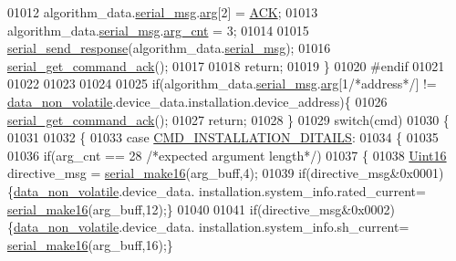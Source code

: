 \begin{DoxyCode}
{{{{{01012            algorithm\_data.\hyperlink{a00016_afcf5f557aea688aad985eec15269c1da}{serial\_msg}.\hyperlink{a00031_af7d6f762438c80072bd9dc0e4dd4ae1e}{arg}[2] = \hyperlink{a00021_a6f6489887e08bff4887d0bc5dcf214d8}{ACK};
01013            algorithm\_data.\hyperlink{a00016_afcf5f557aea688aad985eec15269c1da}{serial\_msg}.\hyperlink{a00031_a7b79f40e2eeec288091afd340bf8f591}{arg\_cnt} = 3;
01014            
01015            \hyperlink{a00031_a96a3f016ca5b0736424c2695fe9fbdf8}{serial\_send\_response}(algorithm\_data.\hyperlink{a00016_afcf5f557aea688aad985eec15269c1da}{serial\_msg});
01016            \hyperlink{a00031_a7fc7421ed15d6e4516e9878e7455d715}{serial\_get\_command\_ack}();
01017            
01018            \textcolor{keywordflow}{return};
01019         \}
01020 \textcolor{preprocessor}{#endif}
01021 
01022 
01023 
01024 
01025         \textcolor{keywordflow}{if}(algorithm\_data.\hyperlink{a00016_afcf5f557aea688aad985eec15269c1da}{serial\_msg}.\hyperlink{a00031_af7d6f762438c80072bd9dc0e4dd4ae1e}{arg}[1\textcolor{comment}{/*address*/}] != 
      \hyperlink{a00060_a76ac5f917f5308dcd83de0d7c94559fb}{data\_non\_volatile}.device\_data.installation.device\_address)\{
01026             \hyperlink{a00031_a7fc7421ed15d6e4516e9878e7455d715}{serial\_get\_command\_ack}();
01027            \textcolor{keywordflow}{return};
01028         \}
01029         \textcolor{keywordflow}{switch}(cmd)
01030         \{
01031 
01032           \{    
01033                  \textcolor{keywordflow}{case}  \hyperlink{a00021_af91ff280feea1f52e3bdd7f0f556d153}{CMD\_INSTALLATION\_DITAILS}:
01034                 \{
01035 
01036                          \textcolor{keywordflow}{if}(arg\_cnt == 28 \textcolor{comment}{/*expected argument length*/})
01037                          \{
01038                             \hyperlink{a00072_a59a9f6be4562c327cbfb4f7e8e18f08b}{Uint16} directive\_msg =  \hyperlink{a00031_abc17de32f14103a5be219df0d4ad9176}{serial\_make16}(arg\_buff,4);
01039                             \textcolor{keywordflow}{if}(directive\_msg&0x0001)\{\hyperlink{a00060_a76ac5f917f5308dcd83de0d7c94559fb}{data\_non\_volatile}.device\_data.
      installation.system\_info.rated\_current= \hyperlink{a00031_abc17de32f14103a5be219df0d4ad9176}{serial\_make16}(arg\_buff,12);\}
01040                             
01041                             \textcolor{keywordflow}{if}(directive\_msg&0x0002)\{\hyperlink{a00060_a76ac5f917f5308dcd83de0d7c94559fb}{data\_non\_volatile}.device\_data.
      installation.system\_info.sh\_current= \hyperlink{a00031_abc17de32f14103a5be219df0d4ad9176}{serial\_make16}(arg\_buff,16);\}
}}}}}
\end{DoxyCode}
